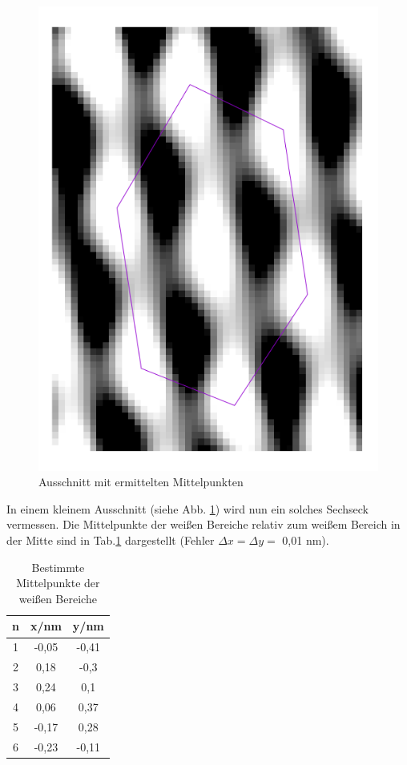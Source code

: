 \begin{figure}
\centering
\includegraphics[angle=90,scale=0.35]{data/graphit/graphit.png}
\caption{Ausschnitt mit ermittelten Mittelpunkten}
\label{fig:small}
\end{figure}

In einem kleinem Ausschnitt (siehe Abb. \ref{fig:small}) wird nun ein solches Sechseck vermessen. Die Mittelpunkte der weißen Bereiche relativ zum weißem Bereich in der Mitte sind in Tab.\ref{tab:points} dargestellt (Fehler $\Delta x=\Delta y=$ 0,01 nm).

\newpage

\begin{table}
\centering
\begin{tabular}{ccc}
\toprule
n & x/nm & y/nm\\
\midrule
1 & -0,05 &-0,41\\
2 & 0,18&	-0,3\\
3 & 0,24&	0,1\\
4 & 0,06&	0,37\\
5 & -0,17&	0,28\\
6 & -0,23&	-0,11\\
\bottomrule
\end{tabular}
\caption{Bestimmte Mittelpunkte der weißen Bereiche}
\label{tab:points}
\end{table}
 
